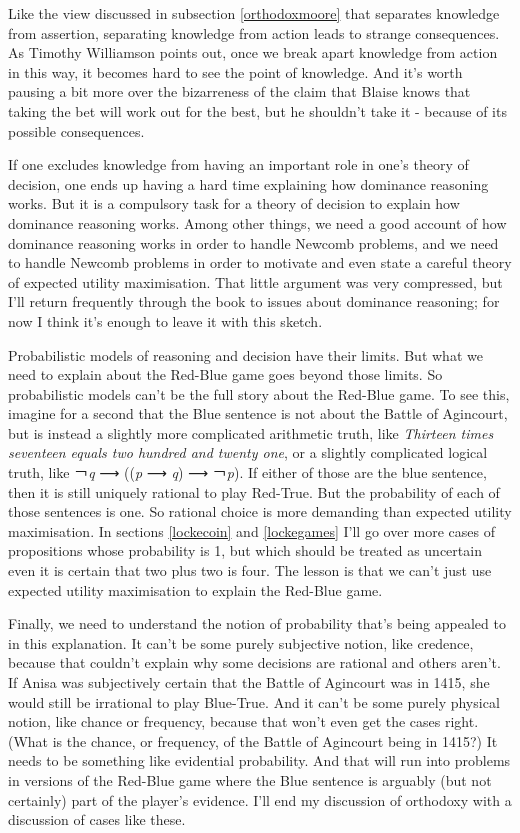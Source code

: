 \documentclass[
  11pt,
]{book}
\begin{document}
Like the view discussed in subsection \ref{orthodoxmoore} that separates knowledge from assertion, separating knowledge from action leads to strange consequences. As Timothy Williamson \citeyearpar{Williamson2005} points out, once we break apart knowledge from action in this way, it becomes hard to see the point of knowledge. And it's worth pausing a bit more over the bizarreness of the claim that Blaise knows that taking the bet will work out for the best, but he shouldn't take it - because of its possible consequences.

If one excludes knowledge from having an important role in one's theory of decision, one ends up having a hard time explaining how dominance reasoning works. But it is a compulsory task for a theory of decision to explain how dominance reasoning works. Among other things, we need a good account of how dominance reasoning works in order to handle Newcomb problems, and we need to handle Newcomb problems in order to motivate and even state a careful theory of expected utility maximisation. That little argument was very compressed, but I'll return frequently through the book to issues about dominance reasoning; for now I think it's enough to leave it with this sketch.

Probabilistic models of reasoning and decision have their limits. But what we need to explain about the Red-Blue game goes beyond those limits. So probabilistic models can't be the full story about the Red-Blue game. To see this, imagine for a second that the Blue sentence is not about the Battle of Agincourt, but is instead a slightly more complicated arithmetic truth, like \emph{Thirteen times seventeen equals two hundred and twenty one}, or a slightly complicated logical truth, like ￢\emph{q} ⟶ ((\emph{p} ⟶ \emph{q}) ⟶ ￢\emph{p}). If either of those are the blue sentence, then it is still uniquely rational to play Red-True. But the probability of each of those sentences is one. So rational choice is more demanding than expected utility maximisation. In sections \ref{lockecoin} and \ref{lockegames} I'll go over more cases of propositions whose probability is 1, but which should be treated as uncertain even it is certain that two plus two is four. The lesson is that we can't just use expected utility maximisation to explain the Red-Blue game.

Finally, we need to understand the notion of probability that's being appealed to in this explanation. It can't be some purely subjective notion, like credence, because that couldn't explain why some decisions are rational and others aren't. If Anisa was subjectively certain that the Battle of Agincourt was in 1415, she would still be irrational to play Blue-True. And it can't be some purely physical notion, like chance or frequency, because that won't even get the cases right. (What is the chance, or frequency, of the Battle of Agincourt being in 1415?) It needs to be something like evidential probability. And that will run into problems in versions of the Red-Blue game where the Blue sentence is arguably (but not certainly) part of the player's evidence. I'll end my discussion of orthodoxy with a discussion of cases like these.
\end{document}
